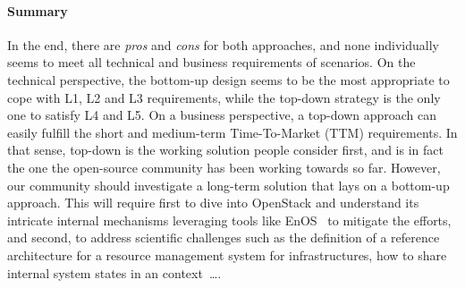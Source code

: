 \paragraph{Summary}
In the end, there are \emph{pros} and \emph{cons} for both approaches,
and none individually seems to meet all technical and business
requirements of \edge scenarios.
On the technical perspective, the bottom-up
design seems to be the most appropriate to cope with L1, L2 and L3
requirements, while the top-down strategy is the only one to satisfy L4
and L5.
%
On a business perspective, a top-down approach can easily fulfill the
short and medium-term Time-To-Market (TTM) requirements. In that
sense, top-down is the working solution people consider first, and is
in fact the one the open-source community has been working towards so
far.
%
However, our community should investigate a long-term solution that
lays on a bottom-up approach.  This will require first to dive into
OpenStack and understand its intricate internal mechanisms leveraging
tools like EnOS~\cite{cherrueau2017toward} to mitigate the efforts,
and second, to address scientific challenges such as the definition of
a reference architecture for a resource management system for \edge
infrastructures, how to share internal system states in an \edge
context~\ldots.










